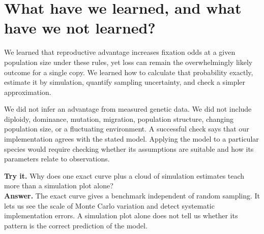 \section{What have we learned, and what have we not learned?}
We learned that reproductive advantage increases fixation odds at a given population size under these rules, yet loss can remain the overwhelmingly likely outcome for a single copy. We learned how to calculate that probability exactly, estimate it by simulation, quantify sampling uncertainty, and check a simpler approximation.

We did not infer an advantage from measured genetic data. We did not include diploidy, dominance, mutation, migration, population structure, changing population size, or a fluctuating environment. A successful check says that our implementation agrees with the stated model. Applying the model to a particular species would require checking whether its assumptions are suitable and how its parameters relate to observations.

\begin{checkpoint}
\textbf{Try it.} Why does one exact curve plus a cloud of simulation estimates teach more than a simulation plot alone?\\[3pt]
\textbf{Answer.} The exact curve gives a benchmark independent of random sampling. It lets us see the scale of Monte Carlo variation and detect systematic implementation errors. A simulation plot alone does not tell us whether its pattern is the correct prediction of the model.
\end{checkpoint}
